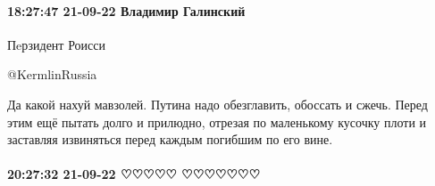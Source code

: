 
 
 
 
 


\paragraph{18:27:47 21-09-22 Владимир Галинский}

Пeрзидент Роисси

@KermlinRussia

Да какой нахуй мавзолей. Путина надо обезглавить, обоссать и сжечь. Перед этим ещё пытать долго и прилюдно, отрезая по маленькому кусочку плоти и заставляя извиняться перед каждым погибшим по его вине.

\paragraph{20:27:32 21-09-22 ♡♡♡♡♡ ♡♡♡♡♡♡♡}

